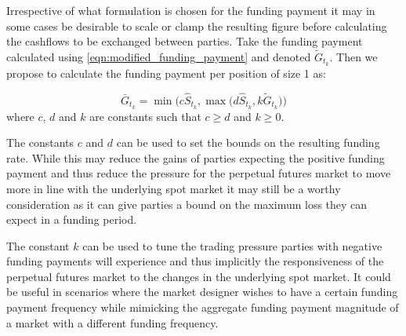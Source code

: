 \documentclass[10pt]{article}
\begin{document}
Irrespective of what formulation is chosen for the funding payment it may in some cases be desirable to scale or clamp the resulting figure before calculating the cashflows to be exchanged between parties. Take the funding payment calculated using \eqref{eqn:modified_funding_payment} and denoted $\tilde G_{t_k}$. Then we propose to calculate the funding payment per position of size 1 as:

$$
\bar G_{t_k} =  \min \Big (c\hat S_{t_k},\max \big(d\hat S_{t_k}, k \tilde G_{t_k} \big ) \Big )
$$
where $c$, $d$ and $k$ are constants such that $ c \ge d $ and $k\geq 0$.

The constants $c$ and $d$ can be used to set the bounds on the resulting funding rate. While this may reduce the gains of parties expecting the positive funding payment and thus reduce the pressure for the perpetual futures market to move more in line with the underlying spot market it may still be a worthy consideration as it can give parties a bound on the maximum loss they can expect in a funding period. 

The constant $k$ can be used to tune the trading pressure parties with negative funding payments will experience and thus implicitly the responsiveness of the perpetual futures market to the changes in the underlying spot market. It could be useful in scenarios where the market designer wishes to have a certain funding payment frequency while mimicking the aggregate funding payment magnitude of a market with a different funding frequency.
\end{document}

